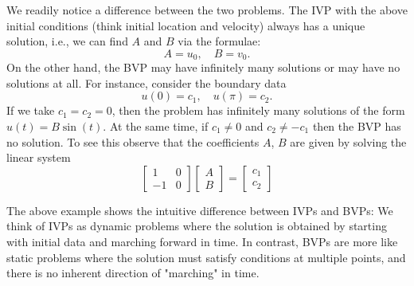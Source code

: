 We readily notice a difference between the two problems. The IVP with 
the above initial conditions (think initial location and velocity) always 
has a unique solution, i.e., we can find $A$ and $B$ via the formulae: 
\begin{equation*}
    A = u_0, \quad B = v_0.
\end{equation*}
On the other hand, the BVP may have infinitely many solutions or
may have no solutions at all.
For instance, consider the boundary data
    \begin{equation*}
        u(0) = c_1, \quad u(\pi) = c_2.
    \end{equation*}
    If we take $c_1 = c_2 = 0$, then the problem has infinitely many 
    solutions of the form $u(t) = B \sin(t)$. 
    At the same time, if $c_1 \neq 0$ and $c_2 \neq -c_1$ then 
    the BVP has no solution. To see this observe that the 
    coefficients $A$, $B$ are given by solving the linear 
    system 
    \begin{equation*}
        \begin{bmatrix}
            1 & 0 \\
            -1 & 0
        \end{bmatrix}
        \begin{bmatrix}
            A \\
            B
        \end{bmatrix}
        =
        \begin{bmatrix}
            c_1 \\
            c_2
        \end{bmatrix}
    \end{equation*}

The above example shows the intuitive difference between IVPs 
and BVPs: We think of IVPs as dynamic problems where the solution is 
obtained by starting with initial data and marching forward in time. 
In contrast, BVPs are more like static problems where the solution must satisfy conditions at multiple points, and there is no inherent direction of "marching" in time.

